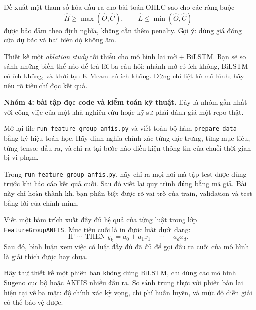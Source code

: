 \begin{exercise}
Đề xuất một tham số hóa đầu ra cho bài toán OHLC sao cho các ràng buộc
\[
\widehat H\ge \max(\widehat O,\widehat C),\qquad
\widehat L\le \min(\widehat O,\widehat C)
\]
được bảo đảm theo định nghĩa, không cần thêm penalty. Gợi ý: dùng giá đóng cửa dự báo và hai biên độ không âm.
\end{exercise}

\begin{exercise}
Thiết kế một \emph{ablation study} tối thiểu cho mô hình lai mờ + BiLSTM. Bạn sẽ so sánh những biến thể nào để trả lời ba câu hỏi: nhánh mờ có ích không, BiLSTM có ích không, và khởi tạo K-Means có ích không. Đừng chỉ liệt kê mô hình; hãy nêu rõ tiêu chí đọc kết quả.
\end{exercise}

\textbf{Nhóm 4: bài tập đọc code và kiểm toán kỹ thuật.} Đây là nhóm gần nhất với công việc của một nhà nghiên cứu hoặc kỹ sư phải đánh giá một repo thật.

\begin{exercise}
Mở lại file \texttt{run\_feature\_group\_anfis.py} và viết toàn bộ hàm \texttt{prepare\_data} bằng ký hiệu toán học. Hãy định nghĩa chính xác từng đặc trưng, từng mục tiêu, từng tensor đầu ra, và chỉ ra tại bước nào điều kiện thông tin của chuỗi thời gian bị vi phạm.
\end{exercise}

\begin{exercise}
Trong \texttt{run\_feature\_group\_anfis.py}, hãy chỉ ra mọi nơi mà tập test được dùng trước khi báo cáo kết quả cuối. Sau đó viết lại quy trình đúng bằng mã giả. Bài này chỉ hoàn thành khi bạn phân biệt được rõ vai trò của train, validation và test bằng lời của chính mình.
\end{exercise}

\begin{exercise}
Viết một hàm trích xuất đầy đủ hệ quả của từng luật trong lớp \texttt{FeatureGroupANFIS}. Mục tiêu cuối là in được luật dưới dạng:
\[
\text{IF } \cdots \text{ THEN } y_k = a_0 + a_1x_1+\cdots + a_dx_d.
\]
Sau đó, bình luận xem việc có luật đầy đủ đã đủ để gọi đầu ra cuối của mô hình là giải thích được hay chưa.
\end{exercise}

\begin{exercise}
Hãy thử thiết kế một phiên bản không dùng BiLSTM, chỉ dùng các mô hình Sugeno cục bộ hoặc ANFIS nhiều đầu ra. So sánh trung thực với phiên bản lai hiện tại về ba mặt: độ chính xác kỳ vọng, chi phí huấn luyện, và mức độ diễn giải có thể bảo vệ được.
\end{exercise}

